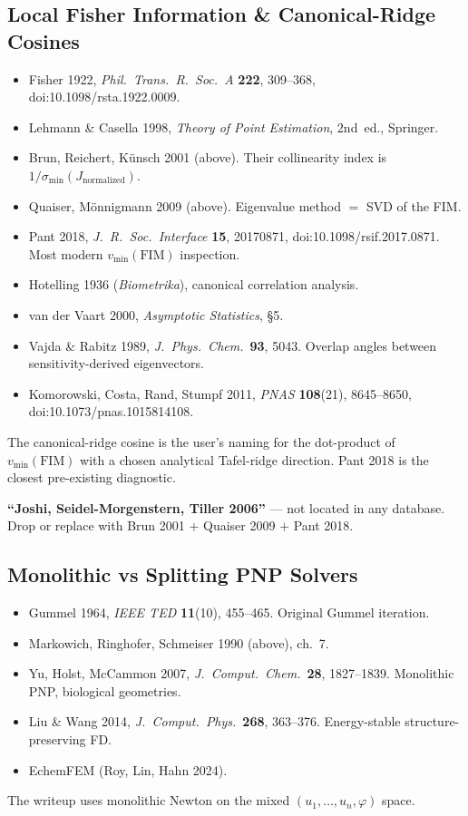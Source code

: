 \documentclass[11pt]{article}
\begin{document}
\subsection{Local Fisher Information \& Canonical-Ridge Cosines}

\begin{itemize}
\item Fisher 1922, \emph{Phil.~Trans.~R.~Soc.~A} \textbf{222}, 309--368,
      doi:10.1098/rsta.1922.0009.
\item Lehmann \& Casella 1998, \emph{Theory of Point Estimation}, 2nd~ed.,
      Springer.
\item Brun, Reichert, K\"unsch 2001 (above). Their collinearity index is
      $1/\sigma_{\min}(J_{\mathrm{normalized}})$.
\item Quaiser, M\"onnigmann 2009 (above). Eigenvalue method $=$ SVD of the FIM.
\item Pant 2018, \emph{J.~R.~Soc.~Interface} \textbf{15}, 20170871,
      doi:10.1098/rsif.2017.0871. Most modern $v_{\min}(\mathrm{FIM})$
      inspection.
\item Hotelling 1936 (\emph{Biometrika}), canonical correlation analysis.
\item van der Vaart 2000, \emph{Asymptotic Statistics}, \S5.
\item Vajda \& Rabitz 1989, \emph{J.~Phys.~Chem.}\ \textbf{93}, 5043. Overlap
      angles between sensitivity-derived eigenvectors.
\item Komorowski, Costa, Rand, Stumpf 2011, \emph{PNAS} \textbf{108}(21),
      8645--8650, doi:10.1073/pnas.1015814108.
\end{itemize}
The canonical-ridge cosine is the user's naming for the dot-product of
$v_{\min}(\mathrm{FIM})$ with a chosen analytical Tafel-ridge direction. Pant
2018 is the closest pre-existing diagnostic.

\textbf{``Joshi, Seidel-Morgenstern, Tiller 2006''} --- not located in any
database. Drop or replace with Brun 2001 $+$ Quaiser 2009 $+$ Pant 2018.

\subsection{Monolithic vs Splitting PNP Solvers}

\begin{itemize}
\item Gummel 1964, \emph{IEEE TED} \textbf{11}(10), 455--465. Original Gummel
      iteration.
\item Markowich, Ringhofer, Schmeiser 1990 (above), ch.~7.
\item Yu, Holst, McCammon 2007, \emph{J.~Comput.~Chem.}\ \textbf{28},
      1827--1839. Monolithic PNP, biological geometries.
\item Liu \& Wang 2014, \emph{J.~Comput.~Phys.}\ \textbf{268}, 363--376.
      Energy-stable structure-preserving FD.
\item EchemFEM (Roy, Lin, Hahn 2024).
\end{itemize}
The writeup uses monolithic Newton on the mixed
$(u_1,\dots,u_n,\varphi)$ space.
\end{document}
